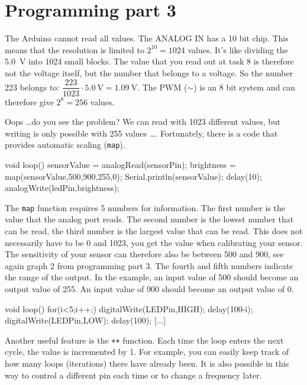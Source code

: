 \documentclass{arduino}
\begin{document}
\newpage

\section{Programming part 3}


The Arduino cannot read all values. The ANALOG IN has a 10 bit chip. This means that the resolution is limited to $ 2^{10} = 1024 $ values. It's like dividing the \SI{5.0}{\volt} into 1024 small blocks. The value that you read out at task 8 is therefore not the voltage itself, but the number that belongs to a voltage. So the number 223 belongs to: $ \dfrac{223}{1023} \cdot \SI{5.0}{\volt} = \SI{1.09}{\volt} $. The PWM ($\sim$) is an 8 bit system and can therefore give $ 2^8 = 256 $ values.

Oops \dots do you see the problem? We can read with 1023 different values, but writing is only possible with 255 values ​​\dots. Fortunately, there is a code that provides automatic scaling (\lstinline{map}).

\begin{marginlisting}
void loop() {
  sensorValue = analogRead(sensorPin);
  brightness = map(sensorValue,500,900,255,0);
  Serial.println(sensorValue);
  delay(10);
  analogWrite(ledPin,brightness);
}
\end{marginlisting}
The \lstinline{map} function requires 5 numbers for information. The first number is the value that the analog port reads. The second number is the lowest number that can be read, the third number is the largest value that can be read. This does not necessarily have to be 0 and 1023, you get the value when calibrating your sensor. The sensitivity of your sensor can therefore also be between 500 and 900, see again graph 2 from programming part 3. The fourth and fifth numbers indicate the range of the output. In the example, an input value of 500 should become an output value of 255. An input value of 900 should become an output value of 0.

\begin{marginlisting}
void loop(){
  for(i<5;i++;) {
    digitalWrite(LEDPin,HIGH);
    delay(100-i);
    digitalWrite(LEDPin,LOW);
    delay(100);
  }
  [...]
}
\end{marginlisting}
Another useful feature is the \lstinline{++} function. Each time the loop enters the next cycle, the value is incremented by 1. For example, you can easily keep track of how many loops (iterations) there have already been. It is also possible in this way to control a different pin each time or to change a frequency later.
\end{document}
